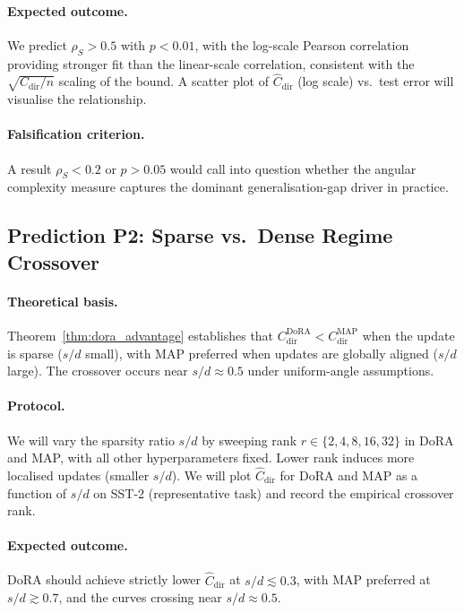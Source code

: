 \documentclass[11pt]{article}
\begin{document}
\paragraph{Expected outcome.}
We predict $\rho_S > 0.5$ with $p < 0.01$, with the log-scale Pearson
correlation providing stronger fit than the linear-scale correlation,
consistent with the $\sqrt{C_{\mathrm{dir}}/n}$ scaling of the bound.
A scatter plot of $\widehat{C}_{\mathrm{dir}}$ (log scale) vs.\ test error
will visualise the relationship.

\paragraph{Falsification criterion.}
A result $\rho_S < 0.2$ or $p > 0.05$ would call into question whether
the angular complexity measure captures the dominant generalisation-gap
driver in practice.

\subsection{Prediction P2: Sparse vs.\ Dense Regime Crossover}
\label{sec:sparse_dense}

\paragraph{Theoretical basis.}
Theorem~\ref{thm:dora_advantage} establishes that
$C^{\mathrm{DoRA}}_{\mathrm{dir}} < C^{\mathrm{MAP}}_{\mathrm{dir}}$
when the update is sparse ($s/d$ small), with MAP preferred when updates
are globally aligned ($s/d$ large).
The crossover occurs near $s/d \approx 0.5$ under uniform-angle
assumptions.

\paragraph{Protocol.}
We will vary the sparsity ratio $s/d$ by sweeping rank
$r \in \{2, 4, 8, 16, 32\}$ in DoRA and MAP, with all other
hyperparameters fixed.
Lower rank induces more localised updates (smaller $s/d$).
We will plot $\widehat{C}_{\mathrm{dir}}$ for DoRA and MAP as a function
of $s/d$ on SST-2 (representative task) and record the empirical crossover
rank.

\paragraph{Expected outcome.}
DoRA should achieve strictly lower $\widehat{C}_{\mathrm{dir}}$ at
$s/d \lesssim 0.3$, with MAP preferred at $s/d \gtrsim 0.7$, and the
curves crossing near $s/d \approx 0.5$.
\end{document}
